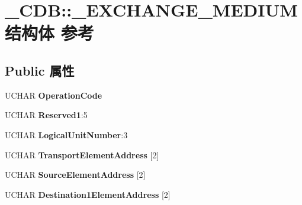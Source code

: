 \hypertarget{struct___c_d_b_1_1___e_x_c_h_a_n_g_e___m_e_d_i_u_m}{}\section{\+\_\+\+C\+DB\+:\+:\+\_\+\+E\+X\+C\+H\+A\+N\+G\+E\+\_\+\+M\+E\+D\+I\+U\+M结构体 参考}
\label{struct___c_d_b_1_1___e_x_c_h_a_n_g_e___m_e_d_i_u_m}
\subsection*{Public 属性}
\begin{DoxyCompactItemize}
\item 
\mbox{\label{struct___c_d_b_1_1___e_x_c_h_a_n_g_e___m_e_d_i_u_m_a2a692adb25a4aea56b2de090eeeb343d}} 
U\+C\+H\+AR {\bfseries Operation\+Code}
\item 
\mbox{\label{struct___c_d_b_1_1___e_x_c_h_a_n_g_e___m_e_d_i_u_m_a32e485f8d37e76efa3eff4b5a2a1434e}} 
U\+C\+H\+AR {\bfseries Reserved1}\+:5
\item 
\mbox{\label{struct___c_d_b_1_1___e_x_c_h_a_n_g_e___m_e_d_i_u_m_ae1ad5f10e8f6e0182b659004f8251296}} 
U\+C\+H\+AR {\bfseries Logical\+Unit\+Number}\+:3
\item 
\mbox{\label{struct___c_d_b_1_1___e_x_c_h_a_n_g_e___m_e_d_i_u_m_a35a72d8a1216e3ddcd95c217b476ffae}} 
U\+C\+H\+AR {\bfseries Transport\+Element\+Address} \mbox{[}2\mbox{]}
\item 
\mbox{\label{struct___c_d_b_1_1___e_x_c_h_a_n_g_e___m_e_d_i_u_m_a0749a7a87a0978fda1c2ee79120d896c}} 
U\+C\+H\+AR {\bfseries Source\+Element\+Address} \mbox{[}2\mbox{]}
\item 
\mbox{\label{struct___c_d_b_1_1___e_x_c_h_a_n_g_e___m_e_d_i_u_m_a45ba4952975905ead21d85d709164277}} 
U\+C\+H\+AR {\bfseries Destination1\+Element\+Address} \mbox{[}2\mbox{]}

\end{DoxyCompactItemize}
